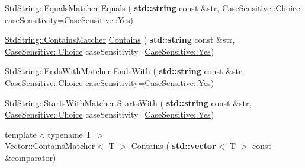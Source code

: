 \begin{DoxyCompactItemize}
\item 
\hyperlink{struct_catch_1_1_matchers_1_1_std_string_1_1_equals_matcher}{Std\+String\+::\+Equals\+Matcher} \hyperlink{namespace_catch_1_1_matchers_af8af7dfc338335ed4c788cb1b37fc59f}{Equals} (\textbf{ std\+::string} const \&str, \hyperlink{struct_catch_1_1_case_sensitive_aad49d3aee2d97066642fffa919685c6a}{Case\+Sensitive\+::\+Choice} case\+Sensitivity=\hyperlink{struct_catch_1_1_case_sensitive_aad49d3aee2d97066642fffa919685c6aa7c5550b69ec3c502e6f609b67f9613c6}{Case\+Sensitive\+::\+Yes})
\item 
\hyperlink{struct_catch_1_1_matchers_1_1_std_string_1_1_contains_matcher}{Std\+String\+::\+Contains\+Matcher} \hyperlink{namespace_catch_1_1_matchers_a1f6c2accdc6cd75a84d7112dcad647b4}{Contains} (\textbf{ std\+::string} const \&str, \hyperlink{struct_catch_1_1_case_sensitive_aad49d3aee2d97066642fffa919685c6a}{Case\+Sensitive\+::\+Choice} case\+Sensitivity=\hyperlink{struct_catch_1_1_case_sensitive_aad49d3aee2d97066642fffa919685c6aa7c5550b69ec3c502e6f609b67f9613c6}{Case\+Sensitive\+::\+Yes})
\item 
\hyperlink{struct_catch_1_1_matchers_1_1_std_string_1_1_ends_with_matcher}{Std\+String\+::\+Ends\+With\+Matcher} \hyperlink{namespace_catch_1_1_matchers_ae5a45efb4538c57c43e04f3f9043ad6e}{Ends\+With} (\textbf{ std\+::string} const \&str, \hyperlink{struct_catch_1_1_case_sensitive_aad49d3aee2d97066642fffa919685c6a}{Case\+Sensitive\+::\+Choice} case\+Sensitivity=\hyperlink{struct_catch_1_1_case_sensitive_aad49d3aee2d97066642fffa919685c6aa7c5550b69ec3c502e6f609b67f9613c6}{Case\+Sensitive\+::\+Yes})
\item 
\hyperlink{struct_catch_1_1_matchers_1_1_std_string_1_1_starts_with_matcher}{Std\+String\+::\+Starts\+With\+Matcher} \hyperlink{namespace_catch_1_1_matchers_a97c9ee09a70378ca7e8c6f9f01b0d6d1}{Starts\+With} (\textbf{ std\+::string} const \&str, \hyperlink{struct_catch_1_1_case_sensitive_aad49d3aee2d97066642fffa919685c6a}{Case\+Sensitive\+::\+Choice} case\+Sensitivity=\hyperlink{struct_catch_1_1_case_sensitive_aad49d3aee2d97066642fffa919685c6aa7c5550b69ec3c502e6f609b67f9613c6}{Case\+Sensitive\+::\+Yes})
\item 
{\footnotesize template$<$typename T $>$ }\\\hyperlink{struct_catch_1_1_matchers_1_1_vector_1_1_contains_matcher}{Vector\+::\+Contains\+Matcher}$<$ T $>$ \hyperlink{namespace_catch_1_1_matchers_a4b3621740dc515216ad31ab827d4092c}{Contains} (\textbf{ std\+::vector}$<$ T $>$ const \&comparator)
\item 

\end{DoxyCompactItemize}
